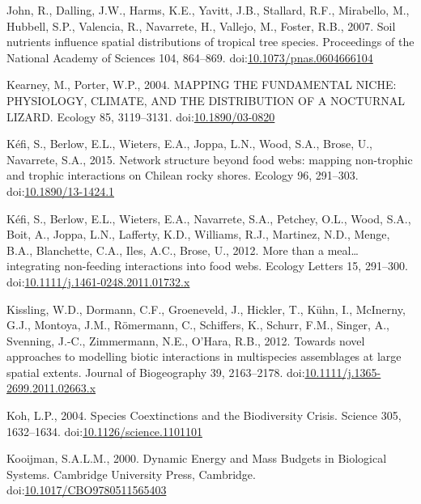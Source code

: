 \hypertarget{ref-John2007}{}
John, R., Dalling, J.W., Harms, K.E., Yavitt, J.B., Stallard, R.F.,
Mirabello, M., Hubbell, S.P., Valencia, R., Navarrete, H., Vallejo, M.,
Foster, R.B., 2007. Soil nutrients influence spatial distributions of
tropical tree species. Proceedings of the National Academy of Sciences
104, 864--869.
doi:\href{https://doi.org/10.1073/pnas.0604666104}{10.1073/pnas.0604666104}

\hypertarget{ref-Kearney2004}{}
Kearney, M., Porter, W.P., 2004. MAPPING THE FUNDAMENTAL NICHE:
PHYSIOLOGY, CLIMATE, AND THE DISTRIBUTION OF A NOCTURNAL LIZARD. Ecology
85, 3119--3131.
doi:\href{https://doi.org/10.1890/03-0820}{10.1890/03-0820}

\hypertarget{ref-Kefi2015}{}
Kéfi, S., Berlow, E.L., Wieters, E.A., Joppa, L.N., Wood, S.A., Brose,
U., Navarrete, S.A., 2015. Network structure beyond food webs: mapping
non-trophic and trophic interactions on Chilean rocky shores. Ecology
96, 291--303.
doi:\href{https://doi.org/10.1890/13-1424.1}{10.1890/13-1424.1}

\hypertarget{ref-Kefi2012}{}
Kéfi, S., Berlow, E.L., Wieters, E.A., Navarrete, S.A., Petchey, O.L.,
Wood, S.A., Boit, A., Joppa, L.N., Lafferty, K.D., Williams, R.J.,
Martinez, N.D., Menge, B.A., Blanchette, C.A., Iles, A.C., Brose, U.,
2012. More than a meal\ldots{} integrating non-feeding interactions into
food webs. Ecology Letters 15, 291--300.
doi:\href{https://doi.org/10.1111/j.1461-0248.2011.01732.x}{10.1111/j.1461-0248.2011.01732.x}

\hypertarget{ref-Kissling2011}{}
Kissling, W.D., Dormann, C.F., Groeneveld, J., Hickler, T., Kühn, I.,
McInerny, G.J., Montoya, J.M., Römermann, C., Schiffers, K., Schurr,
F.M., Singer, A., Svenning, J.-C., Zimmermann, N.E., O'Hara, R.B., 2012.
Towards novel approaches to modelling biotic interactions in
multispecies assemblages at large spatial extents. Journal of
Biogeography 39, 2163--2178.
doi:\href{https://doi.org/10.1111/j.1365-2699.2011.02663.x}{10.1111/j.1365-2699.2011.02663.x}

\hypertarget{ref-Koh2004}{}
Koh, L.P., 2004. Species Coextinctions and the Biodiversity Crisis.
Science 305, 1632--1634.
doi:\href{https://doi.org/10.1126/science.1101101}{10.1126/science.1101101}

\hypertarget{ref-Kooijman2000a}{}
Kooijman, S.A.L.M., 2000. Dynamic Energy and Mass Budgets in Biological
Systems. Cambridge University Press, Cambridge.
doi:\href{https://doi.org/10.1017/CBO9780511565403}{10.1017/CBO9780511565403}

